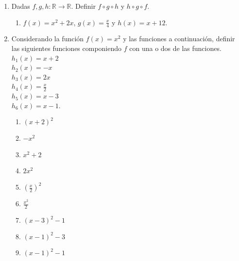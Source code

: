 \documentclass[a4paper]{article}
\newcommand{\exercise}{\item}
\begin{document}
\begin{enumerate}
\begin{enumerate} [label=(\alph*)]
	\end{enumerate}

	\exercise Dadas $f,g,h: \mathbb{R} \to \mathbb{R}$. Definir $f \circ g \circ h$ y $h \circ g \circ f$. 
	\begin{enumerate} [label=(\alph*)]
		\item $f(x)=x^2+2x$, $g(x)=\displaystyle\frac{x}{4}$ y $h(x)=x+12$.
	\end{enumerate}

	\exercise Considerando la función $f(x)=x^2$ y las funciones a continuación, definir las siguientes funciones componiendo $f$ con una o dos de las funciones. \\ $h_1(x)=x+2$ \\ $h_2(x)=-x$ \\ $h_3(x)=2x$ \\ $h_4(x)=\displaystyle\frac{x}{2}$ \\ $h_5(x)=x-3$ \\ $h_6(x)=x-1$.
	\begin{enumerate} [label=(\alph*)]
		\item $(x+2)^2$
		\item $-x^2$
		\item $x^2+2$
		\item $2x^2$
		\item $\left(\displaystyle\frac{x}{2}\right)^2$
		\item $\displaystyle\frac{x^2}{2}$
		\item $(x-3)^2-1$
		\item $(x-1)^2-3$
		\item $(x-1)^2-1$
	\end{enumerate}


\end{enumerate}
\end{document}
